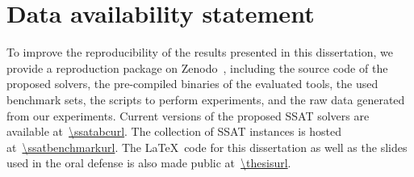 \section{Data availability statement}
To improve the reproducibility of the results presented in this dissertation,
we provide a reproduction package on Zenodo~\cite{dissertation-artifact},
including the source code of the proposed solvers,
the pre-compiled binaries of the evaluated tools,
the used benchmark sets,
the scripts to perform experiments,
and the raw data generated from our experiments.
Current versions of the proposed SSAT solvers are available at~\url{\ssatabcurl}.
The collection of SSAT instances is hosted at~\url{\ssatbenchmarkurl}.
The \LaTeX~code for this dissertation as well as the slides used in the oral defense is also made public at~\url{\thesisurl}.